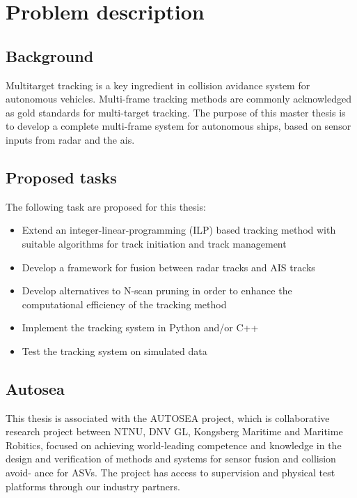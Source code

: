 
\section*{Problem description}

\subsection*{Background}\label{sub:background}
Multitarget tracking is a key ingredient in collision avidance system for autonomous vehicles. Multi-frame tracking methods are commonly acknowledged as gold standards for multi-target tracking. The purpose of this master thesis is to develop a complete multi-frame system for autonomous ships, based on sensor inputs from radar and the \gls{ais}.

\subsection*{Proposed tasks}\label{sub:proposed_tasks}
The following task are proposed for this thesis:
\begin{itemize}
	\item{Extend an integer-linear-programming (ILP) based tracking method with suitable algorithms for track initiation and track management}
	\item{Develop a framework for fusion between radar tracks and AIS tracks}
	\item{Develop alternatives to N-scan pruning in order to enhance the computational efficiency of the tracking method}
	\item{Implement the tracking system in Python and/or C++}
	\item{Test the tracking system on simulated data}
\end{itemize}

\subsection*{Autosea}\label{sub:autosea}
This thesis is associated with the AUTOSEA project, which is collaborative research project between NTNU, DNV GL, Kongsberg Maritime and Maritime Robitics, focused on achieving world-leading competence and knowledge in the design and verification of methods and systems for sensor fusion and collision avoid- ance for ASVs. The project has access to supervision and physical test platforms through our industry partners.